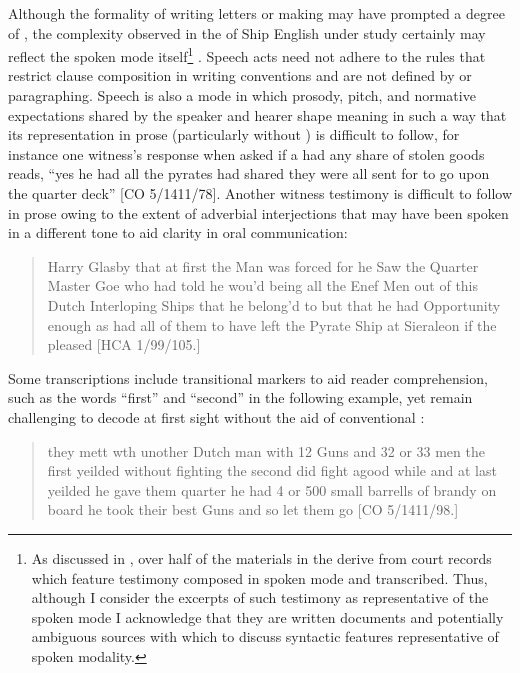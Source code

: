 Although the formality of writing letters or making  may have prompted a degree of , the complexity observed in the  of Ship English under study certainly may reflect the spoken mode itself\footnote{As discussed in , over half of the materials in the  derive from court records which feature testimony composed in spoken mode and transcribed. Thus, although I consider the excerpts of such testimony as representative of the spoken mode I acknowledge that they are written documents and potentially ambiguous sources with which to discuss syntactic features representative of spoken modality.} . Speech acts need not adhere to the rules that restrict clause composition in writing conventions and are not defined by  or paragraphing. Speech is also a mode in which prosody, pitch, and normative expectations shared by the speaker and hearer shape meaning in such a way that its representation in prose (particularly without ) is difficult to follow, for instance one witness’s response when asked if a  had any share of stolen goods reads, “yes he had all the pyrates had shared they were all sent for to go upon the quarter deck” [CO 5/1411/78]. Another witness testimony is difficult to follow in prose owing to the extent of adverbial interjections that may have been spoken in a different tone to aid clarity in oral communication:

\begin{quotation}
Harry Glasby that at first the Man was forced for he Saw the Quarter Master Goe who had told he wou’d being all the Enef Men out of this Dutch Interloping Ships that he belong’d to but that he had Opportunity enough as had all of them to have left the Pyrate Ship at Sieraleon if the pleased [HCA 1/99/105.]
\end{quotation}

Some transcriptions include transitional markers to aid reader comprehension, such as the words “first” and “second” in the following example, yet remain challenging to decode at first sight without the aid of conventional : 

\begin{quotation}
they mett wth unother Dutch man with 12 Guns and 32 or 33 men the first yeilded without fighting the second did fight agood while and at last yeilded he gave them quarter he had 4 or 500 small barrells of brandy on board he took their best Guns and so let them go [CO 5/1411/98.]
\end{quotation}

